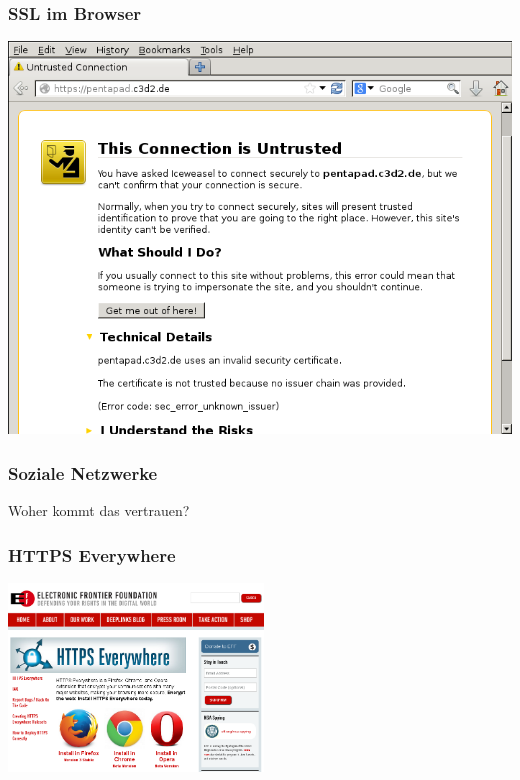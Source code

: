\documentclass[12pt]{beamer}
\begin{document}
\begin{frame}
    \frametitle{SSL im Browser}
    \begin{center}
	\includegraphics[height=0.7\textheight]{img/ssl_unverified.png}
    \end{center}
\end{frame}

\begin{frame}
  \frametitle{Soziale Netzwerke}

  \begin{center} \Large
     Woher kommt das vertrauen?
  \end{center}
\end{frame}

\begin{frame}
  \frametitle{HTTPS Everywhere}
    \begin{center}
      \includegraphics[height=5cm]{img/https-everywhere.png}
    \end{center}
\end{frame}
\end{document}
